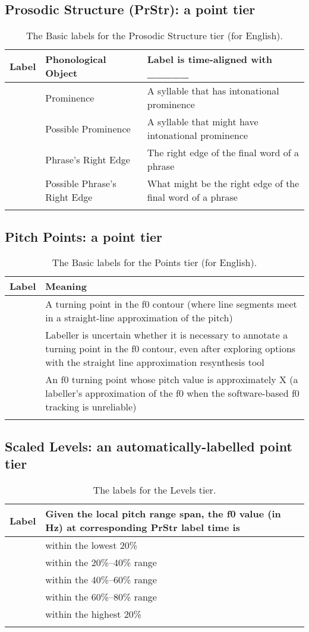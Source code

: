 \documentclass[11pt, twoside]{memoir}
\def\textlabel#1{{\relsize{-.5}\fontspec[Mapping=tex-text]{Roboto Mono}{#1}}}
\begin{document}
\subsection*{Prosodic Structure (PrStr): a point tier}
\begin{longtable}{clp{.525\linewidth}} \toprule \textbf{Label} & \textbf{Phonological Object} & \textbf{Label is time-aligned with \_\_\_\_\_}\tabularnewline
\midrule \endhead
\textlabel{*} & Prominence & A syllable that has intonational prominence \tabularnewline
\textlabel{?*} & Possible Prominence & A syllable that might have intonational prominence \tabularnewline
\textlabel{]} & Phrase’s Right Edge & The right edge of the final word of a phrase \tabularnewline
\textlabel{?]} & Possible Phrase’s Right Edge & What might be the right edge of the final word of a phrase \tabularnewline
\bottomrule 
\caption{The Basic labels for the Prosodic Structure tier (for English).%
}
\end{longtable}

\subsection*{Pitch Points: a point tier}
\begin{longtable}{cp{.8\linewidth}} \toprule \textbf{Label} & \textbf{Meaning} \tabularnewline
\midrule \endhead
\textlabel{0} & A turning point in the f0 contour (where line segments meet in a straight-line approximation of the pitch) \tabularnewline
\textlabel{?0} & Labeller is uncertain whether it is necessary to annotate a turning point in the f0 contour, even after exploring options with the straight line approximation resynthesis tool \tabularnewline
\textlabel{0,X} & An f0 turning point whose pitch value is approximately X (a labeller’s approximation of the f0 when the software-based f0 tracking is unreliable) \tabularnewline
\bottomrule 
\caption{The Basic labels for the Points tier (for English).%
}
\end{longtable}

\subsection*{Scaled Levels: an automatically-labelled point tier}
\begin{longtable}{cp{.8\linewidth}} \toprule
\textbf{Label} & \textbf{Given the local pitch range span, the f0 value (in Hz) at corresponding PrStr label time is} \tabularnewline
\midrule \endhead
\textlabel{1} & within the lowest 20\% \tabularnewline
\textlabel{2} & within the 20\%--40\% range \tabularnewline
\textlabel{3} & within the 40\%--60\% range \tabularnewline
\textlabel{4} & within the 60\%--80\% range \tabularnewline
\textlabel{5} & within the highest 20\% \tabularnewline
\bottomrule 
\caption{The labels for the Levels tier.%
}
\end{longtable}
\end{document}

